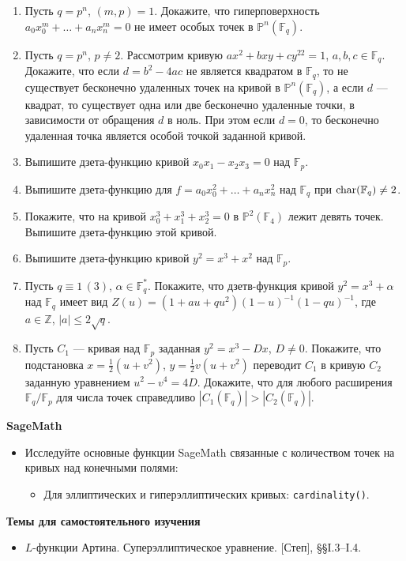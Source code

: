 \begin{enumerate}[topsep=0pt]
    \item Пусть $q=p^n$, $(m,p)=1$. Докажите, что гиперповерхность $a_0 x_0^m + \dots + a_n x_n^m=0$ не имеет особых точек в $\mathbb{P}^n(\mathbb{F}_q)$. %
    \item Пусть $q=p^n$, $p\neq 2$. Рассмотрим кривую $ax^2+bxy+cy^22=1$, $a,b,c \in \mathbb{F}_q$. Докажите, что если $d=b^2-4ac$  не является квадратом в $\mathbb{F}_q$, то не существует бесконечно удаленных точек на кривой в $\mathbb{P}^n(\mathbb{F}_q)$, а если $d$ --- квадрат, то существует одна или две бесконечно удаленные точки, в зависимости от обращения $d$ в ноль. При этом если $d=0$, то бесконечно удаленная точка является особой точкой заданной кривой. %
    \item Выпишите дзета-функцию кривой $x_0 x_1 - x_2 x_3=0$ над $\mathbb{F}_p$. %
    \item Выпишите дзета-функцию для $f = a_0 x_0^2 + \dots + a_n x_n^2$ над $\mathbb{F}_q$ при $\operatorname{char}(\mathbb{F}_q) \neq 2$. %
    \item Покажите, что на кривой $x_0^3+x_1^3+x_2^3 = 0$ в $\mathbb{P}^2(\mathbb{F}_4)$ лежит девять точек. Выпишите дзета-функцию этой кривой. %
    \item Выпишите дзета-функцию кривой $y^2=x^3+x^2$ над $\mathbb{F}_p$. %
    \item Пусть $q \equiv 1\,(3)$, $\alpha\in\mathbb{F}_q^*$. Покажите, что дзетв-функция кривой $y^2=x^3+\alpha$ над $\mathbb{F}_q$ имеет вид $Z(u) = (1+au+qu^2)(1-u)^{-1}(1-qu)^{-1}$, где $a\in\mathbb{Z}$, $|a|\leqslant 2\sqrt{q}$. %
    \item Пусть $C_1$ --- кривая над $\mathbb{F}_p$ заданная $y^2=x^3-Dx$, $D\neq 0$. Покажите, что подстановка $x=\frac{1}{2}(u+v^2)$, $y=\frac{1}{2}v(u+v^2)$ переводит $C_1$ в кривую $C_2$ заданную уравнением $u^2-v^4=4D$. Докажите, что для любого расширения $\mathbb{F}_q/\mathbb{F}_p$ для числа точек справедливо $|C_1(\mathbb{F}_q)| > |C_2(\mathbb{F}_q)|$. %
\end{enumerate}

\noindent\textbf{SageMath}
\begin{itemize}[topsep=0pt]
    \item Исследуйте основные функции SageMath связанные с количеством точек на кривых над конечными полями:
    \begin{itemize}[noitemsep,topsep=0pt]
        \item Для эллиптических и гиперэллиптических кривых: \texttt{cardinality()}.
     \end{itemize}
\end{itemize}

\noindent\textbf{Темы для самостоятельного изучения}
\begin{itemize}[topsep=0pt]
    \item $L$-функции Артина. Суперэллиптическое уравнение. [Степ], \S\S I.3--I.4.
\end{itemize}